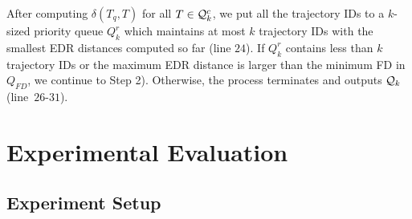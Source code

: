 \documentclass[10pt,conference,letterpaper]{IEEEtran}
\newcommand{\frname}{GAT\xspace }
\newcommand{\simq}{{{\cal Q}_k}\xspace}
\newcommand{\simcand}{{{\cal Q}_k^c}\xspace}
\newcommand{\edr}{{\delta}\xspace}
\begin{document}

After computing $\edr(T_q, T)$ for all $T\in\simcand$, we put all the trajectory IDs to a $k$-sized priority queue ${Q}_k^r$ which maintains at most $k$ trajectory IDs with the smallest EDR distances computed so far (line $24$).
If ${Q}_k^r$ contains less than $k$ trajectory IDs or the maximum EDR distance is larger than the minimum FD in ${Q}_{FD}$, we continue to Step 2). Otherwise, the process terminates and outputs $\simq$ (line~$26$-$31$).













\section{Experimental Evaluation}\label{sec:exp}

\subsection{Experiment Setup}
\end{document}
